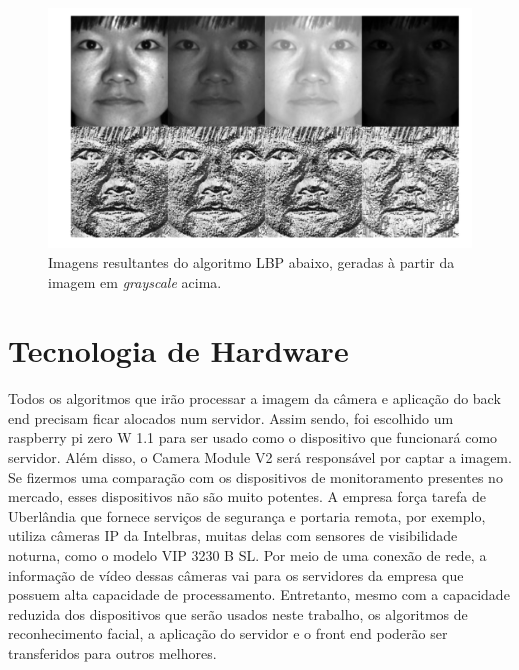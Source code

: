\documentclass[12pt, %
openright, 
oneside, %
a4paper,    %
brazil]{facom-ufu-abntex2}
\begin{document}
\begin{figure}[!ht]
  \centering
\includegraphics[width=0.7\linewidth]{grayscale.PNG}
\caption[De \emph{grayscale} para LBP
]{Imagens resultantes do algoritmo LBP abaixo, geradas à partir da imagem em \emph{grayscale} acima.}
\label{fig:graficosVariandoTamanhoRede}
\end{figure}


\section{Tecnologia de Hardware}

Todos os algoritmos que irão processar a imagem da câmera e aplicação do back end precisam ficar alocados num servidor. Assim sendo, foi
escolhido um raspberry pi zero W 1.1 para ser usado como o dispositivo que funcionará como servidor. Além disso, o Camera Module V2
será responsável por captar a imagem. Se fizermos uma comparação com os dispositivos de monitoramento presentes no mercado,
esses dispositivos não são muito potentes. A empresa força tarefa de Uberlândia que fornece serviços de segurança e portaria remota, por exemplo,
utiliza câmeras IP da Intelbras, muitas delas com sensores de visibilidade noturna, como o modelo VIP 3230 B SL. Por meio de uma conexão de rede, a informação de vídeo
dessas câmeras vai para os servidores da empresa que possuem alta capacidade de processamento. Entretanto, mesmo com a capacidade reduzida
dos dispositivos que serão usados neste trabalho, os algoritmos de reconhecimento facial, a aplicação do servidor e o front end poderão ser transferidos
para outros melhores.

\end{document}
